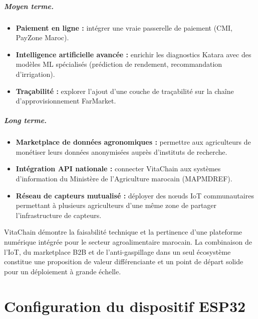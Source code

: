 \documentclass[12pt,a4paper]{report}
\begin{document}
\paragraph{Moyen terme.}
\begin{itemize}
  \item \textbf{Paiement en ligne :} intégrer une vraie passerelle de paiement
        (CMI, PayZone Maroc).
  \item \textbf{Intelligence artificielle avancée :} enrichir les diagnostics Katara
        avec des modèles ML spécialisés (prédiction de rendement, recommandation
        d'irrigation).
  \item \textbf{Traçabilité :} explorer l'ajout d'une couche de traçabilité sur la
        chaîne d'approvisionnement FarMarket.
\end{itemize}

\paragraph{Long terme.}
\begin{itemize}
  \item \textbf{Marketplace de données agronomiques :} permettre aux agriculteurs de
        monétiser leurs données anonymisées auprès d'instituts de recherche.
  \item \textbf{Intégration API nationale :} connecter VitaChain aux systèmes
        d'information du Ministère de l'Agriculture marocain (MAPMDREF).
  \item \textbf{Réseau de capteurs mutualisé :} déployer des nœuds IoT communautaires
        permettant à plusieurs agriculteurs d'une même zone de partager
        l'infrastructure de capteurs.
\end{itemize}

VitaChain démontre la faisabilité technique et la pertinence d'une plateforme numérique
intégrée pour le secteur agroalimentaire marocain. La combinaison de l'IoT, du
marketplace B2B et de l'anti-gaspillage dans un seul écosystème constitue une
proposition de valeur différenciante et un point de départ solide pour un déploiement
à grande échelle.

\appendix

\chapter{Configuration du dispositif ESP32}
\label{annexe:a}
\end{document}
